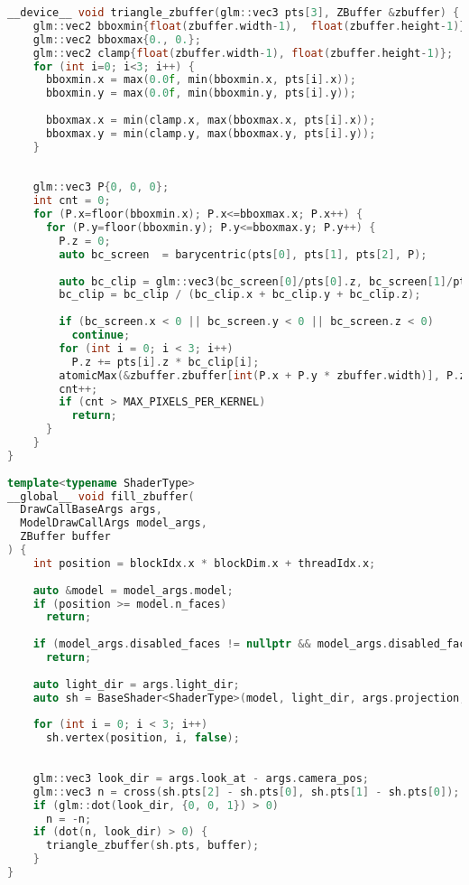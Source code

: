 \begin{lstlisting}[label=lst:z_filler,caption=Реализация алгоритма заполнения z-buffer, language=C++]
__device__ void triangle_zbuffer(glm::vec3 pts[3], ZBuffer &zbuffer) {
    glm::vec2 bboxmin{float(zbuffer.width-1),  float(zbuffer.height-1)};
    glm::vec2 bboxmax{0., 0.};
    glm::vec2 clamp{float(zbuffer.width-1), float(zbuffer.height-1)};
    for (int i=0; i<3; i++) {
      bboxmin.x = max(0.0f, min(bboxmin.x, pts[i].x));
      bboxmin.y = max(0.0f, min(bboxmin.y, pts[i].y));
  
      bboxmax.x = min(clamp.x, max(bboxmax.x, pts[i].x));
      bboxmax.y = min(clamp.y, max(bboxmax.y, pts[i].y));
    }
  
  
    glm::vec3 P{0, 0, 0};
    int cnt = 0;
    for (P.x=floor(bboxmin.x); P.x<=bboxmax.x; P.x++) {
      for (P.y=floor(bboxmin.y); P.y<=bboxmax.y; P.y++) {
        P.z = 0;
        auto bc_screen  = barycentric(pts[0], pts[1], pts[2], P);
  
        auto bc_clip = glm::vec3(bc_screen[0]/pts[0].z, bc_screen[1]/pts[1].z, bc_screen[2]/pts[2].z);
        bc_clip = bc_clip / (bc_clip.x + bc_clip.y + bc_clip.z);
  
        if (bc_screen.x < 0 || bc_screen.y < 0 || bc_screen.z < 0)
          continue;
        for (int i = 0; i < 3; i++)
          P.z += pts[i].z * bc_clip[i];
        atomicMax(&zbuffer.zbuffer[int(P.x + P.y * zbuffer.width)], P.z);
        cnt++;
        if (cnt > MAX_PIXELS_PER_KERNEL)
          return;
      }
    }
}
  
template<typename ShaderType>
__global__ void fill_zbuffer(
  DrawCallBaseArgs args,
  ModelDrawCallArgs model_args,
  ZBuffer buffer
) {
    int position = blockIdx.x * blockDim.x + threadIdx.x;
  
    auto &model = model_args.model;
    if (position >= model.n_faces)
      return;
  
    if (model_args.disabled_faces != nullptr && model_args.disabled_faces[position])
      return;
  
    auto light_dir = args.light_dir;
    auto sh = BaseShader<ShaderType>(model, light_dir, args.projection, args.view, model_args.model_matrix, args.screen_size, args);
  
    for (int i = 0; i < 3; i++)
      sh.vertex(position, i, false);
  
  
    glm::vec3 look_dir = args.look_at - args.camera_pos;
    glm::vec3 n = cross(sh.pts[2] - sh.pts[0], sh.pts[1] - sh.pts[0]);
    if (glm::dot(look_dir, {0, 0, 1}) > 0)
      n = -n;
    if (dot(n, look_dir) > 0) {
      triangle_zbuffer(sh.pts, buffer);
    }
}
\end{lstlisting}

